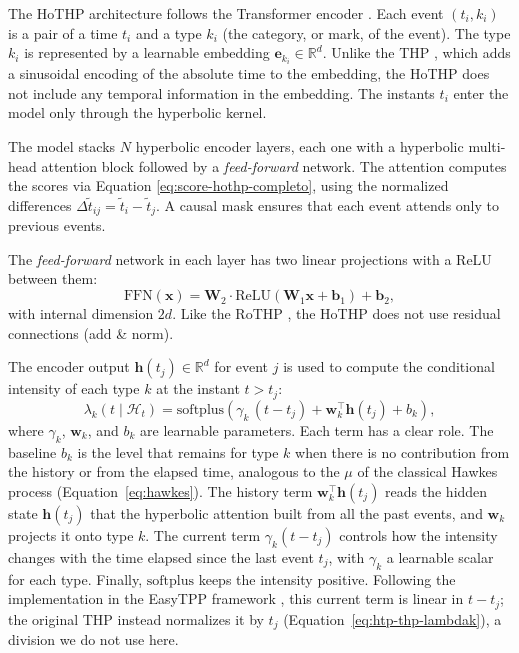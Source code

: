 The HoTHP architecture follows the Transformer encoder \cite{vaswani_attention_2017}. Each event $(t_i, k_i)$ is a pair of a time $t_i$ and a type $k_i$ (the category, or mark, of the event). The type $k_i$ is represented by a learnable embedding $\mathbf{e}_{k_i} \in \mathbb{R}^d$. Unlike the THP \cite{zuo_transformer_2021}, which adds a sinusoidal encoding of the absolute time to the embedding, the HoTHP does not include any temporal information in the embedding. The instants $t_i$ enter the model only through the hyperbolic kernel.

The model stacks $N$ hyperbolic encoder layers, each one with a hyperbolic multi-head attention block followed by a \textit{feed-forward} network. The attention computes the scores via Equation \eqref{eq:score-hothp-completo}, using the normalized differences $\Delta\tilde{t}_{ij} = \tilde{t}_i - \tilde{t}_j$. A causal mask ensures that each event attends only to previous events.

The \textit{feed-forward} network in each layer has two linear projections with a ReLU between them:
%
\begin{equation}
    \mathrm{FFN}(\mathbf{x}) = \mathbf{W}_2 \cdot \mathrm{ReLU}(\mathbf{W}_1 \mathbf{x} + \mathbf{b}_1) + \mathbf{b}_2,
\end{equation}
%
with internal dimension $2d$. Like the RoTHP \cite{dai_rotary_2026}, the HoTHP does not use residual connections (add \& norm).

The encoder output $\mathbf{h}(t_j) \in \mathbb{R}^d$ for event $j$ is used to compute the conditional intensity of each type $k$ at the instant $t > t_j$:
%
\begin{equation}
    \lambda_k(t \mid \mathcal{H}_t)
    = \mathrm{softplus}\!\left(
        \gamma_k \, (t - t_j)
        + \mathbf{w}_k^\top \mathbf{h}(t_j)
        + b_k
    \right),
    \label{eq:intensidade-hothp}
\end{equation}
%
where $\gamma_k$, $\mathbf{w}_k$, and $b_k$ are learnable parameters. Each term has a clear role. The baseline $b_k$ is the level that remains for type $k$ when there is no contribution from the history or from the elapsed time, analogous to the $\mu$ of the classical Hawkes process (Equation~\eqref{eq:hawkes}). The history term $\mathbf{w}_k^\top \mathbf{h}(t_j)$ reads the hidden state $\mathbf{h}(t_j)$ that the hyperbolic attention built from all the past events, and $\mathbf{w}_k$ projects it onto type $k$. The current term $\gamma_k (t - t_j)$ controls how the intensity changes with the time elapsed since the last event $t_j$, with $\gamma_k$ a learnable scalar for each type. Finally, $\mathrm{softplus}$ keeps the intensity positive. Following the implementation in the EasyTPP framework \cite{xue_easytpp_2024}, this current term is linear in $t - t_j$; the original THP \cite{zuo_transformer_2021} instead normalizes it by $t_j$ (Equation~\eqref{eq:htp-thp-lambdak}), a division we do not use here.

